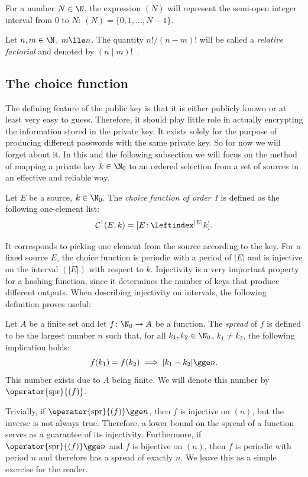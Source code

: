 \documentclass[12pt, a4paper]{article}
\renewcommand{\C}{\mathcal{C}}
\newcommand{\spr}[1]{\operator{\mathrm{spr}}{(#1)}}
\newcommand{\lui}[1]{\leftindex^{#1}}
\newcommand{\elt}{\mathop{:}}
\begin{document}
For a number $ N \in \N $, the expression $ (N) $ will represent the semi-open integer interval from 0 to $ N $: $ (N) = \{0, 1, ..., N-1\} $.

Let $ n, m \in \N $, $ m \lle n $. The quantity $ n!/(n-m)! $ will be called a \emph{relative factorial} and denoted by $ (n \mid m)! $\ .

\subsection{The choice function}

The defining feature of the public key is that it is either publicly known or at least very easy to guess. Therefore, it should play little role in actually encrypting the information stored in the private key. It exists solely for the purpose of producing different passwords with the same private key. So for now we will forget about it. In this and the following subsection we will focus on the method of mapping a private key $ k \in \N_0 $ to an ordered selection from a set of sources in an effective and reliable way.

\begin{definition}
    Let $ E $ be a source, $ k \in \N_0 $. The \emph{choice function of order 1} is defined as the following one-element list:
    \[ \C^1(E, k) = [E \elt \lui{|E|}k]. \]
\end{definition}

It corresponds to picking one element from the source according to the key. For a fixed source $ E $, the choice function is periodic with a period of $ |E| $ and is injective  on the interval $ (|E|) $ with respect to $ k $. Injectivity is a very important property for a hashing function, since it determines the number of keys that produce different outputs. When describing injectivity on intervals, the following definition proves useful:

\begin{definition}
    Let $ A $ be a finite set and let $ f \colon \N_0 \to A $ be a function. The \emph{spread} of $ f $ is defined to be the largest number $ n $ such that, for all $ k_1, k_2 \in \N_0 $, $ k_1 \ne k_2 $, the following implication holds:
    \[ f(k_1) = f(k_2) \implies |k_1 - k_2| \gge n. \]
    This number exists due to $ A $ being finite. We will denote this number by $ \spr{f} $.
\end{definition}

Trivially, if $ \spr{f} \gge n $, then $ f $ is injective on $ (n) $, but the inverse is not always true. Therefore, a lower bound on the spread of a function serves as a guarantee of its injectivity. Furthermore, if $ \spr{f} \gge n $ and $ f $ is bijective on $ (n) $, then $ f $ is periodic with period $ n $ and therefore has a spread of exactly $ n $. We leave this as a simple exercise for the reader.
\end{document}
